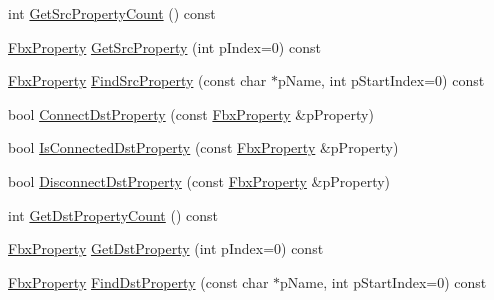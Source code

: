 \begin{Indent}
\begin{DoxyCompactItemize}
int \hyperlink{class_fbx_object_a0c9680063d0f6771dd881cf3950337d6}{Get\+Src\+Property\+Count} () const
\item 
\hyperlink{class_fbx_property}{Fbx\+Property} \hyperlink{class_fbx_object_aa79380869a619b260fd1f861eb224f5e}{Get\+Src\+Property} (int p\+Index=0) const
\item 
\hyperlink{class_fbx_property}{Fbx\+Property} \hyperlink{class_fbx_object_ad87b66288e8308973dc477cda1346a05}{Find\+Src\+Property} (const char $\ast$p\+Name, int p\+Start\+Index=0) const
\item 
bool \hyperlink{class_fbx_object_a6bd087870ae3d3dc82c89105387e7baa}{Connect\+Dst\+Property} (const \hyperlink{class_fbx_property}{Fbx\+Property} \&p\+Property)
\item 
bool \hyperlink{class_fbx_object_a678e5ccdbf6ab28c1df239fbdcea76d3}{Is\+Connected\+Dst\+Property} (const \hyperlink{class_fbx_property}{Fbx\+Property} \&p\+Property)
\item 
bool \hyperlink{class_fbx_object_a0931b1e490684c4ff0532d69a466b4b2}{Disconnect\+Dst\+Property} (const \hyperlink{class_fbx_property}{Fbx\+Property} \&p\+Property)
\item 
int \hyperlink{class_fbx_object_a878feb5a29caf3262360037fe4a5c1e6}{Get\+Dst\+Property\+Count} () const
\item 
\hyperlink{class_fbx_property}{Fbx\+Property} \hyperlink{class_fbx_object_aaec1374d8a9a02429ae4eb317438856d}{Get\+Dst\+Property} (int p\+Index=0) const
\item 
\hyperlink{class_fbx_property}{Fbx\+Property} \hyperlink{class_fbx_object_a3552b9625640d12db3a9cb70a9fae794}{Find\+Dst\+Property} (const char $\ast$p\+Name, int p\+Start\+Index=0) const
\end{DoxyCompactItemize}
\end{Indent}
